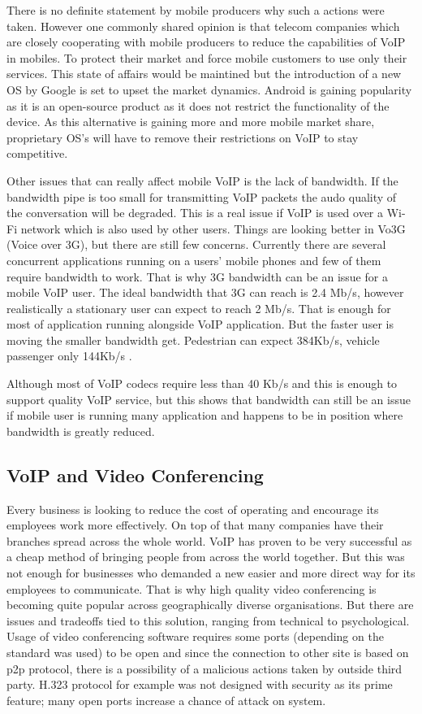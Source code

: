 There is no definite statement by mobile producers why such a actions were taken. However one commonly shared opinion is that telecom companies which are closely cooperating with mobile producers to reduce the capabilities of VoIP in mobiles. To protect their market and force mobile customers to use only their services. This state of affairs would be maintined but the introduction of a new OS by Google is set to upset the market dynamics. Android is gaining popularity as it is an open-source product as it does not restrict the functionality of the device. As this alternative is gaining more and more mobile market share, proprietary OS's will have to remove their restrictions on VoIP to stay competitive.

Other issues that can really affect mobile VoIP is the lack of bandwidth. If the bandwidth pipe is too small for transmitting VoIP packets the audo quality of the conversation will be degraded. This is a real issue if VoIP is used over a Wi-Fi network which is also used by other users. Things are looking better in Vo3G (Voice over 3G), but there are still few concerns. Currently there are several concurrent applications running on a users' mobile phones and few of them require bandwidth to work. That is why 3G bandwidth can be an issue for a mobile VoIP user. The ideal bandwidth that 3G can reach is 2.4 Mb/s, however realistically a stationary user can expect to reach 2 Mb/s. That is enough for most of application running alongside VoIP application. But the faster user is moving the smaller bandwidth get. Pedestrian can expect 384Kb/s, vehicle passenger only 144Kb/s \cite{website:3g_spec}. 

Although most of VoIP codecs require less than 40 Kb/s and this is enough to support quality VoIP service\cite{website:voip_codecs}, but this shows that bandwidth can still be an issue if mobile user is running many application and happens to be in position where bandwidth is greatly reduced.


\subsection{VoIP and Video Conferencing}
Every business is looking to reduce the cost of operating and encourage its employees work more effectively. On top of that many companies have their branches spread across the whole world. VoIP has proven to be very successful as a cheap method of bringing people from across the world together. But this was not enough for businesses who demanded a new easier and more direct way for its employees to communicate. That is why high quality video conferencing is becoming quite popular across geographically diverse organisations. But there are issues and tradeoffs tied to this solution, ranging from technical to psychological. Usage of video conferencing software requires some ports (depending on the standard was used) to be open and since the connection to other site is based on p2p protocol, there is a possibility of a malicious actions taken by outside third party. H.323 protocol for example was not designed with security as its prime feature; many open ports increase a chance of attack on system\cite{website:vid_conf_voice_protocol_overview}.

